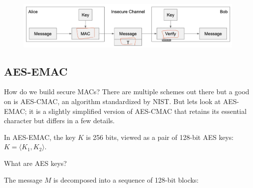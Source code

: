 \documentclass{article}
\begin{document}
\begin{figure}[H]
    \centering
    \includegraphics[scale=.28]{images/macs.png}
    \caption{}
\end{figure}

\subsection{AES-EMAC}
How do we build secure MACs? There are multiple schemes out there but a good on is AES-CMAC, an algorithm standardized by NIST. But lets look at AES-EMAC; it is a slightly simplified version of AES-CMAC that retains its essential character but differs in a few details.

In AES-EMAC, the key $K$ is 256 bits, viewed as a pair of 128-bit AES keys: $K = \langle K_1, K_2 \rangle$.

    {\color{red} What are AES keys?}

The message $M$ is decomposed into a sequence of 128-bit blocks:
\end{document}
